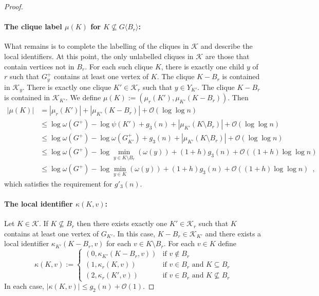 \documentclass{patmorin}
\renewcommand{\le}{\leqslant}
\newcommand{\torso}[2]{{#1}\langle{#2}\rangle}
\newcommand{\Oh}{\calO}
\newcommand{\calK}{\mathcal{K}}
\newcommand{\calO}{\mathcal{O}}
\begin{document}
\begin{proof}
    \paragraph{\boldmath The clique label $\mu(K)$ for $K\not\subseteq\torso{G}{B_r}$:}  What remains is to complete the labelling of the cliques in $\calK$ and describe the local identifiers.
    At this point, the only unlabelled cliques in $\calK$ are those that contain vertices not in $B_r$.
    For each such clique $K$, there is exactly one child $y$ of $r$ such that $G^+_y$ contains at least one vertex of $K$.
    The clique $K-B_r$ is contained in $\calK_y$.  There is exactly one clique $K'\in\calK_r$ such that $y\in Y_{K'}$.
    The clique $K-B_r$ is contained in $\calK_{K'}$. We define $\mu(K):=(\mu_r(K'),\mu_{K'}(K-B_r))$.  Then
    \begin{align*}
     |\mu(K)|
       & = |\mu_r(K')| + |\mu_{K'}(K-B_r)| + \Oh(\log\log n) \\
       & \le \log\omega(G^+)-\log\psi(K') + g_3(n) + |\mu_{K'}(K\setminus B_r)| + \Oh(\log\log n) \\
       & \le \log\omega(G^+)-\log\omega(G^+_{K'}) + g_3(n)  + |\mu_{K'}(K\setminus B_r)| + \Oh(\log\log n) \\
       & \le \log\omega(G^+)-\log\min_{y\in K\setminus B_r}(\omega(y)) + (1+h)g_3(n) + \Oh((1+h)\log\log n) \\
       & \le \log\omega(G^+)-\log\min_{y\in K}(\omega(y)) + (1+h)g_3(n) + \Oh((1+h)\log\log n) \enspace ,
    \end{align*}
    which satisfies the requirement for $g'_3(n)$.

    \paragraph{\boldmath The local identifier $\kappa(K,v)$:}
    Let $K\in\calK$.
    If $K\not\subseteq B_r$ then there exists exactly one $K'\in \calK_r$ such that $K$ contains at least one vertex of $G_{K'}$.
    In this case, $K-B_r\in \calK_{K'}$ and there exists a local identifier $\kappa_{K'}(K-B_r,v)$ for each $v\in K\setminus B_r$.
    For each $v\in K$ define
    \[
     \kappa(K,v):=
     \begin{cases}
       (0,\kappa_{K'}(K-B_r,v)) & \text{if $v\not\in B_r$} \\
       (1,\kappa_r(K,v)) & \text{if $v\in B_r$ and $K\subseteq B_r$} \\
       (2,\kappa_r(K',v)) & \text{if $v\in B_r$ and $K\not\subseteq B_r$}
     \end{cases}
     \]
     In each case, $|\kappa(K,v)|\le g_2(n)+\Oh(1)$.


\end{proof}
\end{document}
